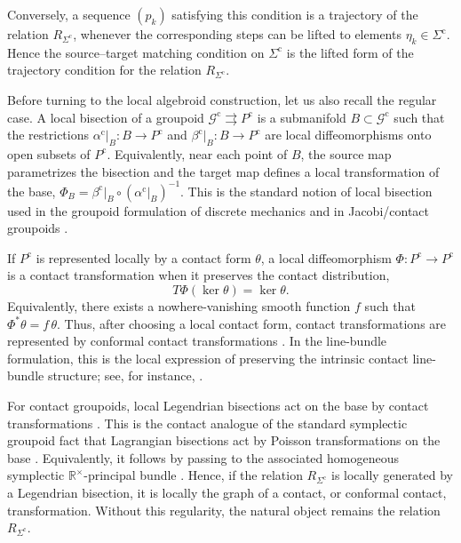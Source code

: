 \documentclass[11pt]{article}
\newcommand{\Rtimes}{\mathbb{R}^{\times}}
\begin{document}
Conversely, a sequence \((p_k)\) satisfying this condition is a trajectory of
the relation \(R_{\Sigma^{\mathrm c}}\), whenever the corresponding steps can
be lifted to elements \(\eta_k\in\Sigma^{\mathrm c}\). Hence the source--target
matching condition on \(\Sigma^{\mathrm c}\) is the lifted form of the
trajectory condition for the relation \(R_{\Sigma^{\mathrm c}}\).

\medskip

Before turning to the local algebroid construction, let us also recall the
regular case. A local bisection of a groupoid $\mathcal G^{\mathrm c}\rightrightarrows P^{\mathrm c}$ is a submanifold \(B\subset\mathcal G^{\mathrm c}\) such that the restrictions $\alpha^{\mathrm c}|_B:B\to P^{\mathrm c}$ and $\beta^{\mathrm c}|_B:B\to P^{\mathrm c}$ are local diffeomorphisms onto open subsets of \(P^{\mathrm c}\). Equivalently,
near each point of \(B\), the source map parametrizes the bisection and the
target map defines a local transformation of the base,
$\Phi_B
=
\beta^{\mathrm c}|_B
\circ
\left(\alpha^{\mathrm c}|_B\right)^{-1}$. This is the standard notion of local bisection used in the groupoid formulation
of discrete mechanics \cite{MarreroMartinDeDiegoStern2015} and in Jacobi/contact groupoids
\cite{IglesiasMarrero2003,CrainicZhu2007}.

If \(P^{\mathrm c}\) is represented locally by a contact form \(\theta\), a
local diffeomorphism \(\Phi:P^{\mathrm c}\to P^{\mathrm c}\) is a contact
transformation when it preserves the contact distribution,
\[
T\Phi(\ker\theta)=\ker\theta .
\]
Equivalently, there exists a nowhere-vanishing smooth function \(f\) such that
\(\Phi^*\theta=f\,\theta\). Thus, after choosing a local contact form, contact
transformations are represented by conformal contact transformations
\cite{Geiges2008}. In the line-bundle formulation, this is the local expression
of preserving the intrinsic contact line-bundle structure; see, for instance,
\cite{BGG2017,GG2024}.

For contact groupoids, local Legendrian bisections act on the base by contact
transformations \cite{IglesiasMarrero2003, CrainicZhu2007}. This is the contact analogue of the standard symplectic
groupoid fact that Lagrangian bisections act by Poisson transformations on the
base \cite{MarreroMartinDeDiegoStern2015}. Equivalently, it follows by passing to the associated homogeneous
symplectic \(\Rtimes\)-principal bundle
\cite{BGG2017}. Hence, if the relation
\(R_{\Sigma^{\mathrm c}}\) is locally generated by a Legendrian bisection, it is
locally the graph of a contact, or conformal contact, transformation. Without
this regularity, the natural object remains the relation
\(R_{\Sigma^{\mathrm c}}\).
\end{document}

